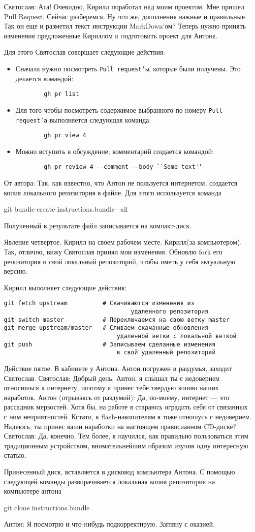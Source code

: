 \documentclass{play}
\begin{document}
Святослав: Ага! Очевидно, Кирилл поработал над моим проектом. Мне пришел  Pull Request.
Сейчас разберемся. Ну что же, дополнения важные и правильные. Так он еще и разметил текст
инструкции MarkDown'ом? 
Теперь нужно принять изменения предложенные Кириллом и подготовить проект для Антона.

Для этого Святослав совершает следующие действия:
\begin{itemize}
	\item Сначала нужно посмотреть \texttt{Pull request'ы}, которые были получены.
		Это делается командой:
		\begin{verbatim}
		gh pr list
		\end{verbatim}
	\item Для того чтобы посмотреть содержимое выбранного по номеру \texttt{Pull request'а}
		выполняется следующая команда:
		\begin{verbatim}
		gh pr view 4
		\end{verbatim}
	\item Можно вступить в обсуждение, комментарий создается командой:
		\begin{verbatim}
		gh pr review 4 --comment --body ``Some text''
		\end{verbatim}
\end{itemize}
От автора:
Так, как известно, что Антон не пользуется интернетом, создается копия локального 
репозитория в файле. Для этого используется команда

git bundle create instructions.bundle --all

Полученный в результате файл записывается на компакт-диск.

Явление четвертое.
Кирилл на своем рабочем месте. 
Кирилл(за компьютером). Так, отлично, вижу Святослав принял мои изменения. Обновлю fork его 
репозитория и свой локальный репозиторий, чтобы иметь у себя актуальную версию.

Кирилл выполняет следующие действия:
\begin{verbatim}
git fetch upstream			# Скачиваются изменения из 
									удаленного репозитория
git switch master			# Переключаемся на свою ветку master
git merge upstream/master	# Сливаем скачанные обновления 
								удаленной ветки с локальной веткой
git push					# Записываем сделанные изменения
								в свой удаленный репозиторий
\end{verbatim}

Действие пятое. 
В кабинете у Антона. Антон погружен в раздумья, заходит Святослав.
Святослав: Добрый день. Антон, я слышал ты с недоверием относишься к интернету, поэтому я принес
тебе твердую копию наших наработок. 
Антон (отрываясь от раздумий): Да, по-моему, интернет --- это рассадник мерзостей. 
Хотя бы, на работе я стараюсь оградить себя от связанных с ним неприятностей. 
Кстати, к flash-накопителям я тоже отношусь с недоверием. Надеюсь, ты принес ваши наработки
на настоящем православном CD-диске? 
Святослав: Да, конечно. Тем более, я научился, как правильно пользоваться
этим традиционным устройством, внимательнейшим образом изучив одну интересную статью.

Принесенный диск, вставляется в дисковод компьютера Антона. С помощью следующей команды разворачивается
локальная копия репозитория на компьютере антона

git clone instructions.bundle

Антон: Я посмотрю и что-нибудь подкорректирую. Загляну с оказией.
\end{document}
